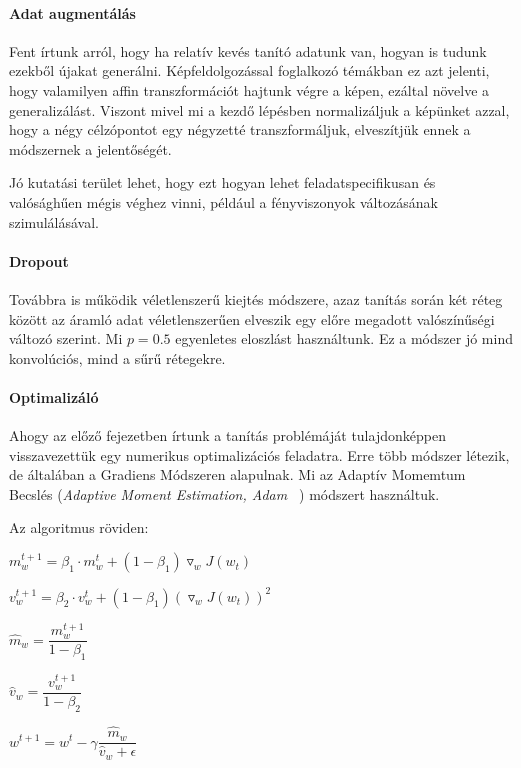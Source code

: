 \paragraph{Adat augmentálás}

Fent írtunk arról, hogy ha relatív kevés tanító adatunk van, hogyan is tudunk
ezekből újakat generálni. Képfeldolgozással foglalkozó témákban ez azt jelenti,
hogy valamilyen affin transzformációt hajtunk végre a képen, ezáltal növelve a 
generalizálást. Viszont mivel mi a kezdő lépésben normalizáljuk a képünket azzal,
hogy a négy célzópontot egy négyzetté transzformáljuk, elveszítjük ennek a módszernek
a jelentőségét.


Jó kutatási terület lehet, hogy ezt hogyan lehet feladatspecifikusan és valósághűen 
mégis véghez vinni, például a fényviszonyok változásának szimulálásával.

\paragraph{Dropout} Továbbra is működik véletlenszerű kiejtés módszere,
azaz tanítás során két réteg között az áramló adat véletlenszerűen elveszik
egy előre megadott valószínűségi változó szerint. Mi $ p=0.5 $ egyenletes 
eloszlást használtunk. Ez a módszer jó mind konvolúciós, mind a sűrű rétegekre.



\paragraph{Optimalizáló}

Ahogy az előző fejezetben írtunk a tanítás problémáját tulajdonképpen visszavezettük
egy numerikus optimalizációs feladatra. Erre több módszer létezik, de általában a 
Gradiens Módszeren alapulnak. Mi az Adaptív Momemtum Becslés 
(\textit{Adaptive Moment Estimation, Adam~\cite{adam} }) módszert használtuk.

\noindent
Az algoritmus röviden:

$ m_w^{t+1} = \beta_1 \cdot m_w^{t} + (1-\beta_1) \triangledown_w J(w_t) $

$ v_w^{t+1} = \beta_2 \cdot v_w^{t} + (1-\beta_1) (\triangledown_w J(w_t))^2 $

$ \hat{m}_w = \dfrac{m_w^{t+1}}{1 - \beta_1} $

$ \hat{v}_w = \dfrac{v_w^{t+1}}{1 - \beta_2} $

$ w^{t+1} = w^{t} - \gamma \dfrac{\hat{m}_w}{\hat{v}_w + \epsilon}   $

